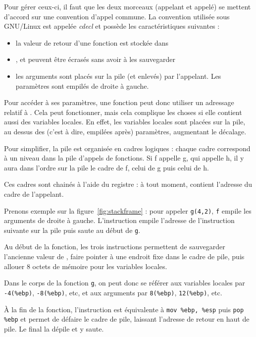 Pour gérer ceux-ci, il faut que les deux morceaux (appelant et appelé) se
mettent d'accord sur une convention d'appel commune. La convention utilisée sous
GNU/Linux est appelée \emph{cdecl} et possède les caractéristiques suivantes :

\begin{itemize}
\item la valeur de retour d'une fonction est stockée dans \eax
\item \eax, \ecx et \edx peuvent être écrasés sans avoir à les sauvegarder
\item les arguments sont placés sur la pile (et enlevés) par l'appelant. Les
  paramètres sont empilés de droite à gauche.
\end{itemize}

Pour accéder à ses paramètres, une fonction peut donc utiliser un adressage
relatif à \esp. Cela peut fonctionner, mais cela complique les choses si elle
contient aussi des variables locales. En effet, les variables locales sont
placées sur la pile, au dessus des (c'est à dire, empilées après) paramètres,
augmentant le décalage.

Pour simplifier, la pile est organisée en cadres logiques : chaque cadre
correspond à un niveau dans la pile d'appels de fonctions. Si f appelle g, qui
appelle h, il y aura dans l'ordre sur la pile le cadre de f, celui de g puis
celui de h.

Ces cadres sont chainés à l'aide du registre \ebp : à tout moment, \ebp contient
l'adresse du cadre de l'appelant.

Prenons exemple sur la figure~\ref{fig:stackframe} : pour appeler
\texttt{g(4,2)}, \texttt{f} empile les arguments de droite à gauche.
L'instruction  empile l'adresse de l'instruction suivante sur
la pile puis saute au début de \texttt{g}.

Au début de la fonction, les trois instructions permettent de sauvegarder
l'ancienne valeur de \ebp, faire pointer \ebp à une endroit fixe dans le cadre
de pile, puis allouer 8 octets de mémoire pour les variables locales.

Dans le corps de la fonction \texttt{g}, on peut donc se référer aux variables
locales par \texttt{-4(\%ebp)}, \texttt{-8(\%ebp)}, etc, et aux arguments par
  \texttt{8(\%ebp)}, \texttt{12(\%ebp)}, etc.

À la fin de la fonction, l'instruction  est équivalente à
\texttt{mov \%ebp, \%esp} puis \texttt{pop \%ebp} et permet de défaire le cadre
de pile, laissant l'adresse de retour en haut de pile. Le  final
la dépile et y saute.

